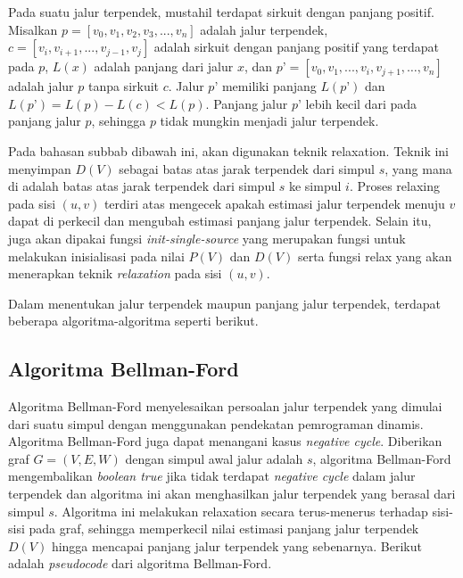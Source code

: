 Pada suatu jalur terpendek, mustahil terdapat sirkuit dengan  panjang positif. Misalkan $p = [v_{0}, v_{1}, v_{2}, v_{3}, ..., v_{n}]$ adalah jalur terpendek, 
$c = [v_{i}, v_{i+1}, ..., v_{j-1}, v_{j}]$ adalah sirkuit dengan panjang positif yang terdapat pada $p$, $L(x)$ adalah panjang dari jalur $x$, dan 
$p’ = [v_{0}, v_{1}, ..., v_{i}, v_{j+1}, …, v_{n}]$ adalah jalur $p$ tanpa sirkuit $c$. Jalur $p’$ memiliki panjang $L(p’)$ dan 
$L(p’) = L(p) - L(c) < L(p)$. Panjang jalur $p’$ lebih kecil dari pada panjang jalur $p$, sehingga $p$ tidak mungkin menjadi jalur terpendek.

Pada bahasan subbab dibawah ini, akan digunakan teknik relaxation. Teknik ini menyimpan $D(V)$ sebagai batas atas jarak terpendek dari simpul $s$, 
yang mana di adalah batas atas jarak terpendek dari simpul $s$ ke simpul $i$. Proses relaxing pada sisi $(u, v)$ terdiri atas mengecek apakah estimasi 
jalur terpendek menuju $v$ dapat di perkecil dan mengubah estimasi panjang jalur terpendek. Selain itu, juga akan dipakai fungsi \textit{init-single-source} 
yang merupakan fungsi untuk melakukan inisialisasi pada nilai $P(V)$ dan $D(V)$ serta fungsi relax yang akan menerapkan teknik \textit{relaxation} pada sisi $(u,v)$.

\medskip


\medskip


Dalam menentukan jalur terpendek maupun panjang jalur terpendek, terdapat beberapa algoritma-algoritma seperti berikut.

    \subsection{Algoritma Bellman-Ford}
    Algoritma Bellman-Ford menyelesaikan persoalan jalur terpendek yang dimulai dari suatu simpul dengan menggunakan pendekatan pemrograman dinamis. 
    Algoritma Bellman-Ford juga dapat menangani kasus \textit{negative cycle}. Diberikan 
    graf $G = (V, E, W)$ dengan simpul awal jalur adalah $s$, algoritma Bellman-Ford mengembalikan \textit{boolean true} jika tidak terdapat \textit{negative cycle} dalam 
    jalur terpendek dan algoritma ini akan menghasilkan jalur terpendek yang berasal dari simpul $s$. Algoritma ini melakukan \textit{}{relaxation} secara terus-menerus 
    terhadap sisi-sisi pada graf, sehingga memperkecil nilai estimasi panjang jalur terpendek $D(V)$ hingga mencapai panjang jalur terpendek yang sebenarnya. 
    Berikut adalah \textit{pseudocode} dari algoritma Bellman-Ford.

